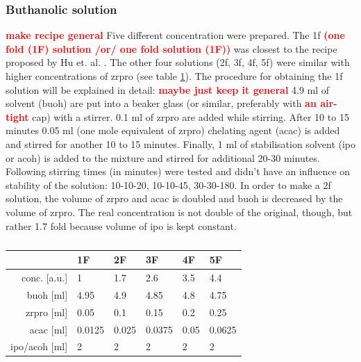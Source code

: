 \documentclass[a4paper]{article}
\newcommand{\td}[1]{\textbf{\textcolor{red}{#1}}}
\newcommand{\ds}[1]{}
\begin{document}
\subsubsection{Buthanolic solution}
\label{sec:sol}
\td{make recipe general}
Five different concentration were prepared. 
The \gls{1f} \td{(one fold (1F) solution /or/ one fold solution (1F))}
was closest to the recipe proposed by Hu et. al. \cite{Hu2016}. 
The other four solutions (\gls{2f}, \gls{3f}, \gls{4f}, \gls{5f}) were similar with higher concentrations of \gls{zrpro} (see table \ref{tab:rec2}).
The procedure for obtaining the \gls{1f} solution will be explained in detail: \td{maybe just keep it general}
%
4.9 ml of solvent (\gls{buoh}) are put into a beaker glass (or similar, preferably with \td{an air-tight} cap) with a stirrer. 
0.1 ml of \gls{zrpro} are added while stirring.  
After 10 to 15 minutes 0.05 ml (\ds{approximately }one mole equivalent of \gls{zrpro}) chelating agent (\gls{acac}) is added and stirred for another 10 to 15 minutes. 
Finally, 1 ml of stabilisation solvent (\gls{ipo} or \gls{acoh}) is added to the mixture and stirred for additional 20-30 minutes. 
Following stirring times (in minutes) were tested and didn't have an influence on stability of the solution: 10-10-20, 10-10-45, 30-30-180. 
In order to make a 
\gls{2f}
solution, the volume of \gls{zrpro} and \gls{acac} is doubled and \gls{buoh} is decreased by the volume of \gls{zrpro}. 
The real concentration is not double of the original, though, but rather 1.7 fold because volume of \gls{ipo} is kept constant.

\begin{table}[h]
	\centering
	\caption{}
	\label{tab:rec2}
	\begin{tabular}{rlllll}
		\hline
				&1F		&2F		&3F		&4F		&5F		\\
		\hline
		conc. [a.u.]	&1		&1.7	&2.6	&3.5	&4.4	\\
		\hline
		\gls{buoh} [ml]		&4.95	&4.9	&4.85	&4.8	&4.75	\\
		\gls{zrpro} [ml]	&0.05	&0.1	&0.15	&0.2	&0.25	\\
		\gls{acac} [ml]		&0.0125	&0.025	&0.0375	&0.05	&0.0625	\\
		\gls{ipo}/\gls{acoh} [ml]		&2		&2		&2		&2		&2		\\
		\hline
	\end{tabular}
\end{table}
\end{document}
